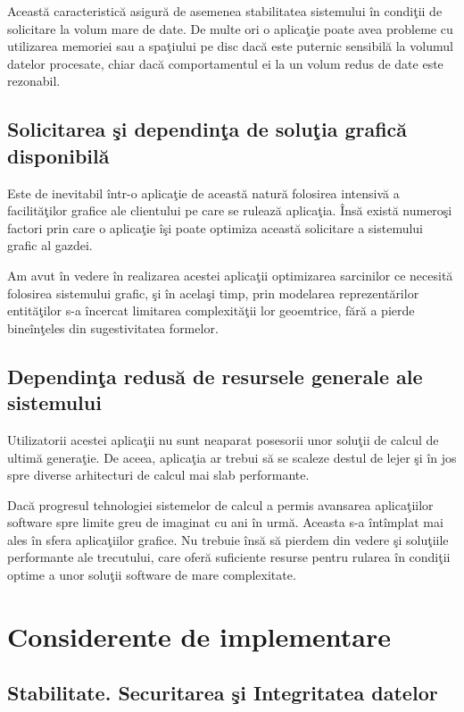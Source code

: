 Această caracteristică asigură de asemenea stabilitatea sistemului în condiţii
de solicitare la volum mare de date. De multe ori o aplicaţie poate avea
probleme cu utilizarea memoriei sau a spaţiului pe disc dacă este puternic
sensibilă la volumul datelor procesate, chiar dacă comportamentul ei la un volum
redus de date este rezonabil.

\subsection{Solicitarea şi dependinţa de soluţia grafică disponibilă}

Este de inevitabil într-o aplicaţie de această natură folosirea intensivă a
facilităţilor grafice ale clientului pe care se rulează aplicaţia. Însă există
numeroşi factori prin care o aplicaţie îşi poate optimiza această solicitare a
sistemului grafic al gazdei.

Am avut în vedere în realizarea acestei aplicaţii optimizarea sarcinilor ce
necesită folosirea sistemului grafic, şi în acelaşi timp, prin modelarea
reprezentărilor entităţilor s-a încercat limitarea complexităţii lor geoemtrice,
fără a pierde bineînţeles din sugestivitatea formelor.

\subsection{Dependinţa redusă de resursele generale ale sistemului}

Utilizatorii acestei aplicaţii nu sunt neaparat posesorii unor soluţii de calcul
de ultimă generaţie. De aceea, aplicaţia ar trebui să se scaleze destul de lejer
şi în jos spre diverse arhitecturi de calcul mai slab performante.

Dacă progresul tehnologiei sistemelor de calcul a permis avansarea aplicaţiilor
software spre limite greu de imaginat cu ani în urmă. Aceasta s-a întîmplat mai
ales în sfera aplicaţiilor grafice. Nu trebuie însă să pierdem din vedere şi
soluţiile performante ale trecutului, care oferă suficiente resurse pentru
rularea în condiţii optime a unor soluţii software de mare complexitate.

\section{Considerente de implementare}

\subsection{Stabilitate. Securitarea şi Integritatea datelor}

